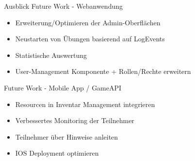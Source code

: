 \begin{frame}{Ausblick}
	Future Work - Webanwendung
	\begin{itemize}
		\item Erweiterung/Optimieren der Admin-Oberflächen
		\item Neustarten von Übungen basierend auf LogEvents
		\item Statistische Auswertung
		\item User-Management Komponente + Rollen/Rechte erweitern 	
	\end{itemize}

    Future Work - Mobile App / GameAPI
	\begin{itemize}
		\item Resourcen in Inventar Management integrieren
		\item Verbessertes Monitoring der Teilnehmer
		\item Teilnehmer über Hinweise anleiten
		\item IOS Deployment optimieren
	\end{itemize}
\end{frame}
